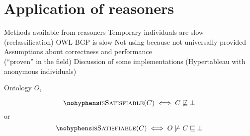 \documentclass[paper.tex]{subfiles}
\begin{document}
\section{Application of reasoners}
\label{sec:reasoners}

\begin{todos}
  \todo Methods available from reasoners
  \todo Temporary individuals are slow (reclassification)
  \todo OWL BGP is slow
  \todo Not using  because not universally provided
  \todo Assumptions about correctness and performance \\(``proven'' in the field)
  \todo Discussion of some implementations (Hypertableau with anonymous individuals)
\end{todos}

Ontology $O$,

\[ \textproc{isSatisfiable}(C) \iff C \not\sqsubseteq \bot \]
or
\[ \textproc{isSatisfiable}(C) \iff O \not\sementails C \sqsubseteq \bot \]
\end{document}
